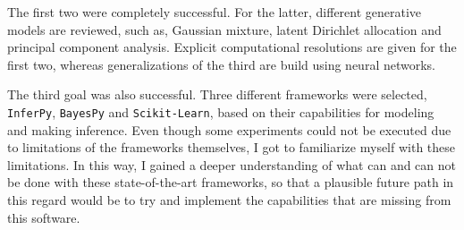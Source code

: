 The first two were completely successful. For the latter, different generative models are reviewed, such as, Gaussian mixture, latent Dirichlet allocation and principal component analysis. Explicit computational resolutions are given for the first two, whereas generalizations of the third are build using neural networks.

The third goal was also successful. Three different frameworks were selected, \texttt{InferPy}, \texttt{BayesPy} and \texttt{Scikit-Learn}, based on their capabilities for modeling and making inference. Even though some experiments could not be executed due to limitations of the frameworks themselves, I got to familiarize myself with these limitations. In this way, I gained a deeper understanding of what can and can not be done with these state-of-the-art frameworks, so that a plausible future path in this regard would be to try and implement the capabilities that are missing from this software.
